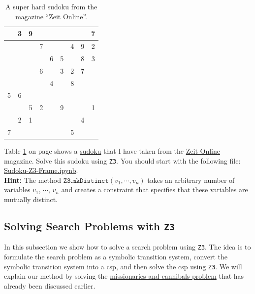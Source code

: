 \begin{table}[h]
  \centering
  \begin{tabular}{||c|c|c||c|c|c||c|c|c||}
    \hline
    \hline
      & 3 & 9 &   &   &   &   &   & 7 \\
    \hline
      &   &   & 7 &   &   & 4 & 9 & 2 \\
    \hline
      &   &   &   & 6 & 5 &   & 8 & 3 \\
    \hline
    \hline
      &   &   & 6 &   & 3 & 2 & 7 &   \\
    \hline
      &   &   &   & 4 &   & 8 &   &   \\
    \hline
    5 & 6 &   &   &   &   &   &   &   \\
    \hline
    \hline
      &   & 5 & 2 &   & 9 &   &   & 1 \\
    \hline
      & 2 & 1 &   &   &   &   & 4 &   \\
    \hline
    7 &   &   &   &   &   & 5 &   &   \\
    \hline
    \hline
  \end{tabular}
  \caption{A super hard sudoku from the magazine ``Zeit Online''.}
  \label{tab:sudoku}
\end{table}


\exerciseEng
{}
Table \ref{tab:sudoku} on page \pageref{tab:sudoku} shows a \href{https://en.wikipedia.org/wiki/Sudoku}{sudoku}
that I have taken from the
\href{http://sudoku.zeit.de/cgi-bin/sudoku/sudoku_kd_app_2016.pl?action=level&kd_nr=24091123601092&year=2018&month=03&day=23&level=-c+5}{Zeit Online}
magazine.
Solve this sudoku using \texttt{Z3}.  You should start with the following file:
\\[0.2cm]
\hspace*{1.3cm}
\href{https://github.com/karlstroetmann/Logic/blob/master/Java/Chapter-5/Sudoku-Z3-Frame.ipynb}{Sudoku-Z3-Frame.ipynb}.
\\[0.2cm]
\textbf{Hint:} The method $\texttt{Z3.mkDistinct}(v_1, \cdots, v_n)$ takes an arbitrary number of variables
$v_1$, $\cdots$, $v_n$ and creates a constraint that specifies that these variables are mutually distinct.
\eox

\subsection{Solving Search Problems with \texttt{Z3}}
In this subsection we show how to solve a search problem using \texttt{Z3}.  The idea is to formulate the
search problem as a symbolic transition system, convert the symbolic transition system into a \Gls{csp}, and
then solve the \Gls{csp} using \texttt{Z3}.
We will explain our method by solving the
\href{https://en.wikipedia.org/wiki/Missionaries_and_cannibals_problem}{missionaries and cannibals problem}
that has already been discussed earlier.  

